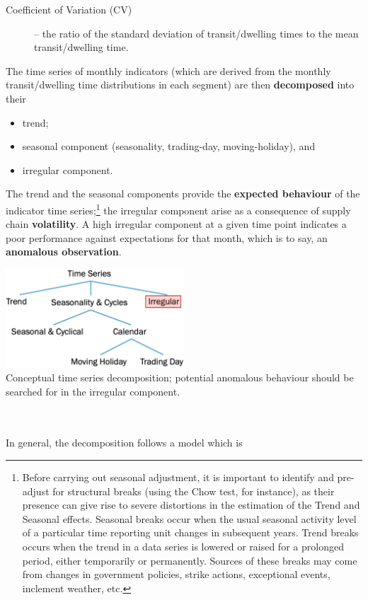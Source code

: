 \documentclass[20pt,landscape,footrule,headrule]{foils}
\begin{document}
\begin{center}
\begin{description}
\item[Coefficient of Variation (CV)] -- the ratio of the standard deviation of transit/dwelling times to the mean transit/dwelling time.  
\end{description}
The time series of monthly indicators (which are derived from the monthly transit/dwelling time distributions in each segment) are then \textbf{decomposed} into their 
\begin{itemize} 
\item trend;
\item seasonal component (seasonality, trading-day, moving-holiday), and 
\item irregular component.
\end{itemize}
\noindent The trend and the seasonal components provide the \textbf{expected behaviour} of the indicator time series;\footnote{Before carrying out seasonal adjustment, it is important to identify and pre-adjust for structural breaks (using the Chow test, for instance), as their presence can give rise to severe distortions in the estimation of the Trend and Seasonal effects. Seasonal breaks occur when the usual seasonal activity level of a particular time reporting unit changes in subsequent years. Trend breaks occurs when the trend in a data series is lowered or raised for a prolonged period, either temporarily or permanently. Sources of these breaks may come from changes in government policies, strike actions, exceptional events, inclement weather, etc.} the irregular component arise as a consequence of supply chain \textbf{volatility}. A high irregular component at a given time point indicates a poor performance against expectations for that month, which is to say, an \textbf{anomalous observation}.  
\newpage
\begin{center}
\includegraphics[width=0.5\textwidth]{Images/decomposition_EN.png} \\ 
Conceptual time series decomposition; potential anomalous behaviour should be searched for in the irregular component.
\end{center}
 \ \\ \ \\ In general, the decomposition follows a model which is 

\end{center}
\end{document}

